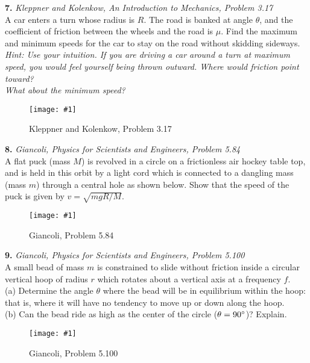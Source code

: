 \documentclass[11pt]{article}
\newcommand{\fig}[4]{
    \begin{figure}[H]
        \centering
        \texttt{[image: \#1]}
        \caption{#2}
        \label{exp4fit}
    \end{figure}
}
\theoremstyle{gangnamstyle}{\newtheorem{definition}{Definition}[]}
\theoremstyle{gangnamstyle}{\newtheorem{example}{Example}[]}
\theoremstyle{gangnamstyle}{\newtheorem{problem}{Problem}[]}
\begin{document}
\pagebreak

\textbf{7.} \textit{Kleppner and Kolenkow, An Introduction to Mechanics, Problem 3.17} \\
A car enters a turn whose radius is $R$. The road is banked at angle $\theta$, and the coefficient of friction between the wheels and the road is $\mu$. Find the maximum and minimum speeds for the car to stay on the road without skidding sideways. \\
\textit{Hint: Use your intuition. If you are driving a car around a turn at maximum speed, you would feel yourself being thrown outward. Where would friction point toward? \\
What about the minimum speed?}
\fig{figs/0627/kk317.png}{Kleppner and Kolenkow, Problem 3.17}{0.7}{0}

\pagebreak

\textbf{8.} \textit{Giancoli, Physics for Scientists and Engineers, Problem 5.84} \\
A flat puck (mass $M$) is revolved in a circle on a frictionless air hockey table top, and is held in this orbit by a light cord which is connected to a dangling mass (mass $m$) through a central hole as shown below. Show that the speed of the puck is given by $v = \sqrt{mgR/M}$. 
\fig{figs/0627/giancoli584.png}{Giancoli, Problem 5.84}{0.65}{0} 

\pagebreak

\textbf{9.} \textit{Giancoli, Physics for Scientists and Engineers, Problem 5.100} \\
A small bead of mass $m$ is constrained to slide without friction inside a circular vertical hoop of radius $r$ which rotates about a vertical axis at a frequency $f$. \\
(a) Determine the angle $\theta$ where the bead will be in equilibrium within the hoop: that is, where it will have no tendency to move up or down along the hoop. \\
(b) Can the bead ride as high as the center of the circle ($\theta = 90\degree$)? Explain.
\fig{figs/0627/giancoli5100.png}{Giancoli, Problem 5.100}{0.5}{0} 




\end{document}
